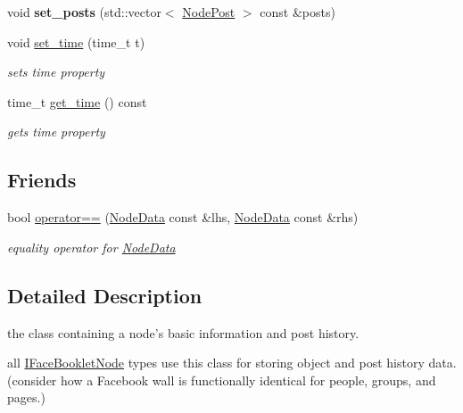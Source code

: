 \begin{DoxyCompactItemize}
\item 
\hypertarget{classfb_1_1_node_data_a7e0387a3b5f6f28b07b9ba1faf007298}{void {\bfseries set\+\_\+posts} (std\+::vector$<$ \hyperlink{structfb_1_1_node_post}{Node\+Post} $>$ const \&posts)}\label{classfb_1_1_node_data_a7e0387a3b5f6f28b07b9ba1faf007298}

\item 
void \hyperlink{classfb_1_1_node_data_a716a7264a589826effcf5a2d9f703f56}{set\+\_\+time} (time\+\_\+t t)
\begin{DoxyCompactList}\small\item\em sets time property \end{DoxyCompactList}\item 
time\+\_\+t \hyperlink{classfb_1_1_node_data_a4eb55ccdaa280ac553252419e5118593}{get\+\_\+time} () const 
\begin{DoxyCompactList}\small\item\em gets time property \end{DoxyCompactList}\end{DoxyCompactItemize}
\subsection*{Friends}
\begin{DoxyCompactItemize}
\item 
\hypertarget{classfb_1_1_node_data_afc99fbf74a99bfdfcd08a0adaca816d0}{bool \hyperlink{classfb_1_1_node_data_afc99fbf74a99bfdfcd08a0adaca816d0}{operator==} (\hyperlink{classfb_1_1_node_data}{Node\+Data} const \&lhs, \hyperlink{classfb_1_1_node_data}{Node\+Data} const \&rhs)}\label{classfb_1_1_node_data_afc99fbf74a99bfdfcd08a0adaca816d0}

\begin{DoxyCompactList}\small\item\em equality operator for \hyperlink{classfb_1_1_node_data}{Node\+Data} \end{DoxyCompactList}\end{DoxyCompactItemize}


\subsection{Detailed Description}
the class containing a node's basic information and post history. 

all \hyperlink{structfb_1_1_i_face_booklet_node}{I\+Face\+Booklet\+Node} types use this class for storing object and post history data. (consider how a Facebook wall is functionally identical for people, groups, and pages.) 

